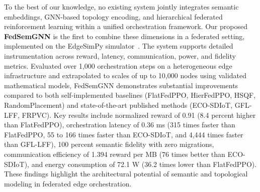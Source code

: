 To the best of our knowledge, no existing system jointly integrates semantic embeddings, GNN-based topology encoding, and hierarchical federated reinforcement learning within a unified orchestration framework. Our proposed \textbf{FedSemGNN} is the first to combine these dimensions in a federated setting, implemented on the EdgeSimPy simulator~\cite{edgesimpy}. The system supports detailed instrumentation across reward, latency, communication, power, and fidelity metrics. Evaluated over 1,000 orchestration steps on a heterogeneous edge infrastructure and extrapolated to scales of up to 10,000 nodes using validated mathematical models, FedSemGNN demonstrates substantial improvements compared to both self-implemented baselines (FlatFedPPO, HierFedPPO, HSQF, RandomPlacement) and state-of-the-art published methods (ECO-SDIoT, GFL-LFF, FRPVC). Key results include normalized reward of 0.91 (8.4 percent higher than FlatFedPPO), orchestration latency of 0.36 ms (315 times faster than FlatFedPPO, 55 to 166 times faster than ECO-SDIoT, and 4,444 times faster than GFL-LFF), 100 percent semantic fidelity with zero migrations, communication efficiency of 1.394 reward per MB (76 times better than ECO-SDIoT), and energy consumption of 72.1 W (36.2 times lower than FlatFedPPO). These findings highlight the architectural potential of semantic and topological modeling in federated edge orchestration.
